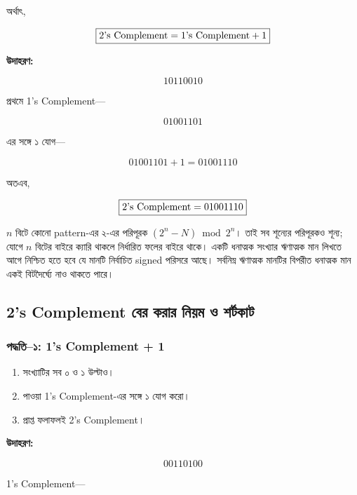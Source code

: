 অর্থাৎ,

\[
\boxed{
\text{\textenglish{2's Complement}}
=
\text{\textenglish{1's Complement}}+1
}
\]

\textbf{\textcolor{ICTOrange}{উদাহরণ:}}

\[
10110010
\]

প্রথমে \textenglish{1's Complement}—

\[
01001101
\]

এর সঙ্গে ১ যোগ—

\[
01001101+1=01001110
\]

অতএব,

\[
\boxed{
\text{\textenglish{2's Complement}}
=
01001110
}
\]


$n$ বিটে কোনো pattern-এর ২-এর পরিপূরক $(2^n-N)\bmod2^n$। তাই সব শূন্যের পরিপূরকও শূন্য; যোগে $n$ বিটের বাইরে ক্যারি থাকলে নির্ধারিত ফলের বাইরে থাকে। একটি ধনাত্মক সংখ্যার ঋণাত্মক মান লিখতে আগে নিশ্চিত হতে হবে যে মানটি নির্বাচিত signed পরিসরে আছে। সর্বনিম্ন ঋণাত্মক মানটির বিপরীত ধনাত্মক মান একই বিটদৈর্ঘ্যে নাও থাকতে পারে।

\subsection{\textenglish{2's Complement} বের করার নিয়ম ও শর্টকাট}

\subsubsection*{পদ্ধতি--১:
\textenglish{1's Complement + 1}}

\par\begingroup

\begin{enumerate}
    \item সংখ্যাটির সব ০ ও ১ উল্টাও।
    \item পাওয়া \textenglish{1's Complement}-এর সঙ্গে ১ যোগ করো।
    \item প্রাপ্ত ফলাফলই \textenglish{2's Complement}।
\end{enumerate}
\par\endgroup


\textbf{\textcolor{ICTOrange}{উদাহরণ:}}

\[
00110100
\]

\textenglish{1's Complement}—


